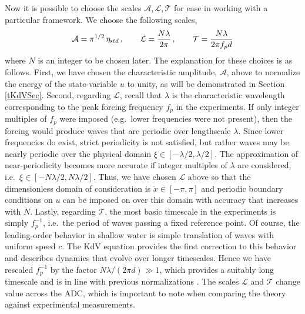 \documentclass[11pt]{article}
\newcommand{\freqp}{f_p}
\newcommand{\etastd}{\eta_{\text std}}
\newcommand{\depth}{d}
\newcommand{\lam}{\lambda}
\newcommand{\lamfac}{N}
\newcommand{\ampscale}{\mathcal{A}}
\newcommand{\lengthscale}{\mathcal{L}}
\newcommand{\timescale}{\mathcal{T}}
\begin{document}
Now it is possible to choose the scales $\ampscale, \lengthscale, \timescale$ for ease in working with a particular framework. We choose the following scales,
\begin{align}
\label{scales}
\ampscale = \pi^{1/2} \, \etastd \, , \qquad
\lengthscale = \frac{\lamfac \lam}{2 \pi} \, , \qquad
\timescale = \frac{\lamfac \lam}{2 \pi \freqp \depth}
\end{align}
where $\lamfac$ is an integer to be chosen later. 
The explanation for these choices is as follows. First, we have chosen the characteristic amplitude, $\ampscale$, above to normalize the energy of the state-variable $u$ to unity, as will be demonstrated in Section \ref{tKdVSec}. Second, regarding $\lengthscale$, recall that $\lam$ is the characteristic wavelength corresponding to the peak forcing frequency $\freqp$ in the experiments. If only integer multiples of $\freqp$ were imposed (e.g.~lower frequencies were not present), then the forcing would produce waves that are periodic over lengthscale $\lam$. Since lower frequencies do exist, strict periodicity is not satisfied, but rather waves may be nearly periodic over the physical domain $\xi \in [-\lam/2, \lam/2]$. The approximation of near-periodicity becomes more accurate if integer multiples of $\lam$ are considered, i.e.~$\xi \in [-\lamfac \lam/2, \lamfac \lam/2]$. Thus, we have chosen $\lengthscale$ above so that the dimensionless domain of consideration is $\tilde{x} \in [-\pi, \pi]$ and periodic boundary conditions on $u$ can be  imposed on over this domain with accuracy that increases with $\lamfac$. Lastly, regarding $\timescale$, the most basic timescale in the experiments is simply $\freqp^{-1}$, i.e.~the period of waves passing a fixed reference point. Of course, the leading-order behavior in shallow water is simple translation of waves with uniform speed $c$. The KdV equation provides the first correction to this behavior and describes dynamics that evolve over longer timescales. Hence we have rescaled $\freqp^{-1}$ by the factor $N \lam/(2 \pi \depth) \gg 1$, which provides a suitably long timescale and is in line with previous normalizations \cite{johnson1997modern}. The scales $\lengthscale$ and $\timescale$ change value across the ADC, which is important to note when comparing the theory against experimental measurements.
\end{document}

